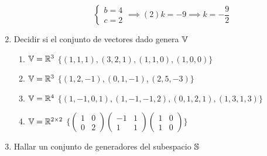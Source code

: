 \documentclass[../practica.root.tex]{subfiles}
\begin{document}
\begin{enumerate}
\begin{enumerate}
\[\begin{cases}
                            b = 4     \\
                            c = 2
                        \end{cases}
                        \implies (2)k = -9 \implies \boxed{k = -\frac{9}{2}}
                    \]
          \end{enumerate}
    \item Decidir si el conjunto de vectores dado genera $\V$
          \begin{enumerate}
              \item $ \V = \R^3 $ \tabr $ \Big\{ (1,1,1),(3,2,1),(1,1,0),(1,0,0) \Big\}  $
              \item $ \V = \R^3 $ \tabr $  \Big\{ (1,2,-1),(0,1,-1),(2,5,-3) \Big\}  $
              \item $ \V = \R^4 $ \tabr $ \Big\{ (1,-1,0,1),(1,-1,-1,2),(0,1,2,1),(1,3,1,3) \Big\}  $
              \item $ \V = \R^{2\x2} $ \tabr $ \Big\{
                        \begin{pmatrix}
                            1 & 0 \\
                            0 & 2
                        \end{pmatrix}
                        \begin{pmatrix}
                            -1 & 1 \\
                            1  & 1
                        \end{pmatrix}
                        \begin{pmatrix}
                            1 & 0 \\
                            1 & 0
                        \end{pmatrix}
                        \Big\} $
          \end{enumerate}
    \item Hallar un conjunto de generadores del subespacio $\S$
\end{enumerate}
\end{document}
